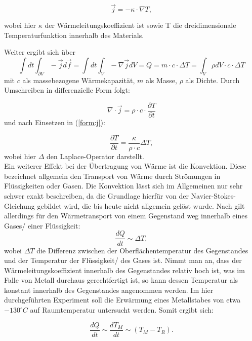 \begin{equation}
\vec{j} = - \kappa \cdot \nabla T, 
\label{form:j}
\end{equation}

wobei hier $ \kappa $ der Wärmeleitungskoeffizient ist sowie T die dreidimensionale Temperaturfunktion innerhalb des Materials. 

Weiter ergibt sich über
\begin{equation}
\int dt \int_{\partial V} -\vec{j} d \vec{f} = \int dt \int_{V} -\nabla \vec{j} dV = Q = m \cdot c \cdot \Delta T = \int_{V} \rho dV \cdot c \cdot \Delta T
\end{equation}
mit $c$ als massebezogene Wärmekapazität, $m$ als Masse, $\rho$ als Dichte. Durch Umschreiben in differenzielle Form folgt: 

\begin{equation}
\nabla \cdot \vec{j} = \rho \cdot c \cdot  \frac{\partial T}{\partial t}
\end{equation} 
und nach Einsetzen in (\ref{form:j}): 

\begin{equation}
\frac{\partial T}{\partial t} = \frac{\kappa}{\rho \cdot c} \Delta T, 
\end{equation}
wobei hier $\Delta$ den Laplace-Operator darstellt. 
\\
Ein weiterer Effekt bei der Übertragung von Wärme ist die Konvektion. Diese bezeichnet allgemein den Transport von Wärme durch Strömungen in Flüssigkeiten oder Gasen. Die Konvektion lässt sich im Allgemeinen nur sehr schwer exakt beschreiben, da die Grundlage hierfür von der Navier-Stokes-Gleichung gebildet wird, die bis heute nicht allgemein gelöst wurde. Nach \cite{praktikumwaerme} gilt allerdings für den Wärmetransport von einem Gegenstand weg innerhalb eines Gases/ einer Flüssigkeit: 
\begin{equation}
\frac{dQ}{dt} \sim \Delta T,
\end{equation}
wobei $\Delta T$ die Differenz zwischen der Oberflächentemperatur des Gegenstandes und der Temperatur der Flüssigkeit/ des Gases ist. 
Nimmt man an, dass der Wärmeleitungskoeffizient innerhalb des Gegenstandes relativ hoch ist, was im Falle von Metall durchaus gerechtfertigt ist, so kann dessen Temperatur als konstant innerhalb des Gegenstandes angenommen werden. 
Im hier durchgeführten Experiment soll die Erwärmung eines Metallstabes von etwa $ -130 ^{\circ} C $ auf Raumtemperatur untersucht werden. Somit ergibt sich: 

\begin{equation}
\frac{dQ}{dt} \sim  \frac{dT_M}{dt} \sim (T_{M} - T_{R}). 
\label{form:konvektion1}
\end{equation}

